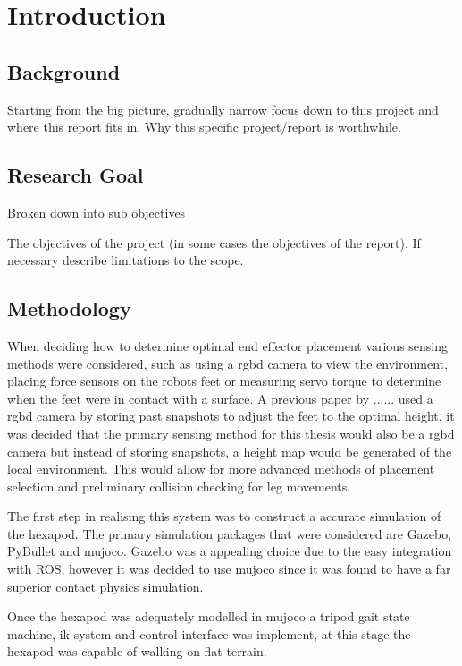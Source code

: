 \chapter{Introduction}

\section{Background}

Starting from the big picture, gradually narrow focus down to this project and where this report fits in.
Why this specific project/report is worthwhile.


\section{Research Goal}
Broken down into sub objectives

The objectives of the project (in some cases the objectives of the report). If necessary describe limitations to the scope.


\section{Methodology}
When deciding how to determine optimal end effector placement various sensing methods were considered, such as using a \ac{rgbd} camera to view the environment,
placing force sensors on the robots feet or measuring servo torque to determine when the feet were in contact with a surface. A previous paper by ...... used a \ac{rgbd} camera
by storing past snapshots to adjust the feet to the optimal height, it was decided that the primary sensing method for this thesis would also be a \ac{rgbd} camera
but instead of storing snapshots, a height map would be generated of the local environment. This would allow for more advanced methods of placement selection
and preliminary collision checking for leg movements.

The first step in realising this system was to construct a accurate simulation of the hexapod. The primary simulation packages that were considered are Gazebo, PyBullet and \ac{mujoco}.
Gazebo was a appealing choice due to the easy integration with ROS, however it was decided to use \ac{mujoco} since it was found to have a far superior contact physics simulation.

Once the hexapod was adequately modelled in \ac{mujoco} a tripod gait state machine, \ac{ik} system and control interface was implement, at this stage the hexapod was capable of walking
on flat terrain.

